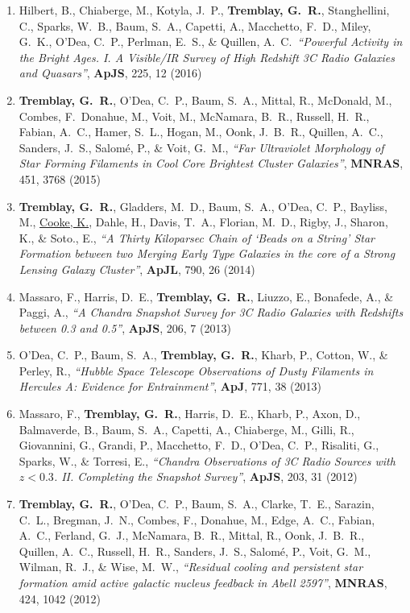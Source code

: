 \documentclass[11pt]{article}
\begin{document}
\begin{enumerate}
\item Hilbert, B., Chiaberge, M., Kotyla, J.~P., \textbf{Tremblay, G.~R.}, Stanghellini, C., Sparks, W.~B., Baum, S.~A., Capetti, A., Macchetto, F.~D., Miley, G.~K., O'Dea, C.~P., Perlman, E.~S., \& Quillen, A.~C.\ \textit{``Powerful Activity in the Bright Ages. I. A Visible/IR Survey of High Redshift 3C Radio Galaxies and Quasars''}, \textbf{ApJS}, 225, 12  (2016)


\item \textbf{Tremblay, G.~R.}, O'Dea, C.~P., Baum, S.~A., Mittal, R., McDonald, M., Combes, F.~Donahue, M., Voit, M., McNamara, B.~R., Russell, H.~R., Fabian, A.~C., Hamer, S.~L., Hogan, M., Oonk, J.~B.~R., Quillen, A.~C., Sanders, J.~S., Salom\'{e}, P., \& Voit, G.~M., \textit{``Far Ultraviolet Morphology of Star Forming Filaments in Cool Core Brightest Cluster Galaxies''}, \textbf{MNRAS}, 451, 3768 (2015)

\item \textbf{Tremblay, G.~R.}, Gladders, M.~D., Baum, S.~A., O'Dea, C.~P., Bayliss, M., \uline{Cooke, K.}, Dahle, H., Davis, T.~A., Florian, M.~D., Rigby, J., Sharon, K., \& Soto., E.,   \textit{``A Thirty Kiloparsec Chain of `Beads on a String' Star Formation between two Merging Early Type Galaxies in the core of a Strong Lensing Galaxy Cluster''}, \textbf{ApJL}, 790, 26 (2014)


\item Massaro, F., Harris, D.~E., \textbf{Tremblay, G.~R.}, Liuzzo, E., Bonafede, A.,
\& Paggi, A., \textit{``A Chandra Snapshot Survey for 3C Radio Galaxies with Redshifts between 0.3 and 0.5''}, \textbf{ApJS}, 206,  7 (2013)


\item O'Dea, C.~P., Baum, S.~A., \textbf{Tremblay, G.~R.}, Kharb, P., Cotton, W.,
\& Perley, R.,  \textit{``Hubble Space Telescope Observations of Dusty Filaments in Hercules A: Evidence for Entrainment''}, \textbf{ApJ}, 771,  38 (2013)


\item Massaro, F., \textbf{Tremblay, G.~R.}, Harris, D.~E., Kharb, P., Axon, D.,
Balmaverde, B., Baum, S.~A., Capetti, A., Chiaberge, M., Gilli, R.,
Giovannini, G., Grandi, P., Macchetto, F.~D., O'Dea, C.~P., Risaliti, G.,
Sparks, W., \& Torresi, E.,  \textit{``Chandra Observations of 3C Radio Sources with $z < 0.3$. II. Completing the Snapshot Survey''}, \textbf{ApJS}, 203,  31 (2012)


\item \textbf{Tremblay, G.~R.}, O'Dea, C.~P., Baum, S.~A., Clarke, T.~E., Sarazin,
C.~L., Bregman, J.~N., Combes, F., Donahue, M., Edge, A.~C., Fabian, A.~C.,
Ferland, G.~J., McNamara, B.~R., Mittal, R., Oonk, J.~B.~R., Quillen,
A.~C., Russell, H.~R., Sanders, J.~S., Salom{\'e}, P., Voit, G.~M., Wilman,
R.~J., \& Wise, M.~W., \textit{``Residual cooling and persistent star formation amid active galactic nucleus feedback in Abell 2597''}, \textbf{MNRAS}, 424,  1042 (2012)



\end{enumerate}
\end{document}
